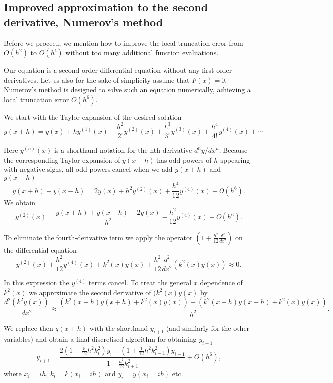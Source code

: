 \subsection{Improved approximation to the second derivative, Numerov's method}

Before we proceed, we mention how to improve the local truncation error from $O(h^2)$ 
to $O(h^6)$ without too many additional function evaluations.

Our equation is a second order differential equation without any
first order derivatives. Let us also for the sake of simplicity assume that
$F(x) = 0$.
Numerov's method is designed to solve such an equation numerically, achieving
a local truncation error $O(h^6)$.


We start with the Taylor expansion of the desired solution
%
\[ 
y(x + h) = y(x) + h y^{(1)}(x) + \frac{h^2}{2!} y^{(2)}(x) 
                  + \frac{h^3}{3!} y^{(3)}(x)
                  + \frac{h^4}{4!} y^{(4)}(x) + \cdots
\]

Here  $y^{(n)}(x)$ is a shorthand notation for the nth derivative 
$d^{n}y / dx^{n}$. Because the corresponding Taylor expansion of 
$y(x - h)$ has odd powers of $h$ appearing with negative signs, all
odd powers cancel when we add $y(x + h)$ and $y(x - h)$
\[
y(x + h) + y(x - h)= 2y(x) + h^2 y^{(2)}(x)
                  + \frac{h^4}{12} y^{(4)}(x) + O(h^6).
\]
% 
We obtain 
% 
\[
 y^{(2)}(x) = \frac{y(x + h) + y(x - h) - 2y(x)}
                               {h^2}
                  - \frac{h^2}{12} y^{(4)}(x) + O(h^6).
\]

To eliminate the fourth-derivative term we apply the operator 
	$(1 + \frac{h^2}{12} \frac{d^2}{d x^2})$  on the differential equation
\[
y^{(2)}(x)  + \frac{h^2}{12} y^{(4)}(x)
   + k^2(x) y(x) + \frac{h^2}{12} \frac{d^2}{dx^2}
                  \left (k^2(x) y(x) \right ) \approx 0.
\]

In this expression the $y^{(4)}$ terms cancel.
To treat the general $x$ dependence of $k^2(x)$ we approximate the
second derivative of $(k^2(x) y(x)$ by 
%
\[
\frac{d^2(k^2 y(x))}{dx^2} \approx 
	   \frac{ \left ( k^2(x + h) y(x + h) +  k^2(x) y(x) \right )
	   + \left ( k^2(x - h) y(x - h) + k^2(x) y(x) \right )}{h^2}.
\]

We replace then $y(x+h)$ with the shorthand $y_{i+1}$ (and similarly for the other variables) 
and obtain a
final discretised algorithm for obtaining $y_{i+1}$
\[
y_{i+1} =
    \frac{2 \left ( 1 - \frac{5}{12} h^2 k^2_{i}\right )y_{i}
            - \left ( 1 + \frac{1}{12} h^2 k^2_{i-1}  \right) y_{i-1}}
             {1 + \frac{h^2}{12} k^2_{i+1}}+O(h^6),
\]
%
where $x_i = ih$, $k_i = k(x_i=ih)$ and $y_i = y(x_i=ih)$ etc.


